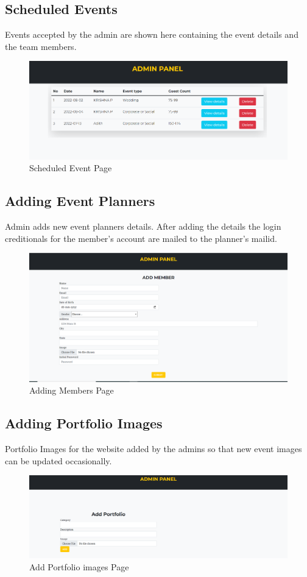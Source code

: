 \subsection{Scheduled Events}
Events accepted by the admin are shown here containing the event details and the team members.
\begin{figure}[H]
	\centering
	\includegraphics[scale=0.35]{scheduledevents.png}
	\caption{Scheduled Event Page}
	\label{Scheduled Event Page}
\end{figure}
\subsection{Adding Event Planners}
Admin adds new event planners details. After adding the details the login creditionals for the member's account are mailed to the planner's mailid.
\begin{figure}[H]
	\centering
	\includegraphics[scale=0.35]{addmember.png}
	\caption{Adding Members Page}
	\label{Adding Members Page}
\end{figure}
\subsection{Adding Portfolio Images}
Portfolio Images for the website added by the admins so that new event images can be updated occasionally.
\begin{figure}[H]
	\centering
	\includegraphics[scale=0.35]{addportfolio.png}
	\caption{Add Portfolio images Page}
	\label{Add Portfolio images Page}
\end{figure}
